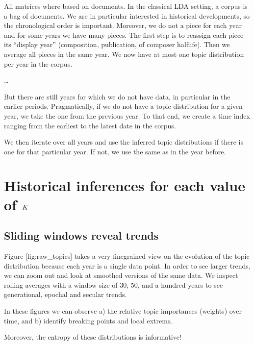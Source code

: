 \documentclass[letterpaper,10pt,english]{sphinxmanual}
\begin{document}
\sphinxAtStartPar
All matrices where based on documents. In the classical LDA setting, a
corpus is a bag of documents. We are in particular interested in
historical developments, so the chronological order is important.
Moreover, we do not a piece for each year and for some years we have
many pieces. The first step is to re\sphinxhyphen{}assign each piece its “display
year” (composition, publication, of composer half\sphinxhyphen{}life). Then we average
all pieces in the same year. We now have at most one topic distribution
per year in the corpus.

\sphinxAtStartPar
…

\sphinxAtStartPar
But there are still years for which we do not have data, in particular
in the earlier periods. Pragmatically, if we do not have a topic
distribution for a given year, we take the one from the previous year.
To that end, we create a time index ranging from the earliest to the
latest date in the corpus.

\sphinxAtStartPar
We then iterate over all years and use the inferred topic distributions
if there is one for that particular year. If not, we use the same as in
the year before.


\section{Historical inferences for each value of \protect\(K\protect\)}
\label{\detokenize{5_notes:historical-inferences-for-each-value-of-k}}

\subsection{Sliding windows reveal trends}
\label{\detokenize{5_notes:sliding-windows-reveal-trends}}
\sphinxAtStartPar
Figure {[}fig:raw\_topics{]} takes a very fine\sphinxhyphen{}grained view on the evolution
of the topic distribution because each year is a single data point. In
order to see larger trends, we can zoom out and look at smoothed
versions of the same data. We inspect rolling averages with a window
size of 30, 50, and a hundred years to see generational, epochal and
secular trends.

\sphinxAtStartPar
In these figures we can observe a) the relative topic importances
(weights) over time, and b) identify breaking points and local extrema.

\sphinxAtStartPar
Moreover, the entropy of these distributions is informative!
\end{document}
